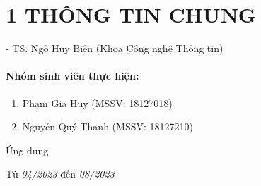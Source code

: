 \newpage

\section*{1  THÔNG TIN CHUNG}

\tab \tab - TS. Ngô Huy Biên (Khoa Công nghệ Thông tin)    

\paragraph{Nhóm sinh viên thực hiện:}
\begin{enumerate}
    \item Phạm Gia Huy (MSSV: 18127018)
    \item Nguyễn Quý Thanh (MSSV: 18127210)
\end{enumerate}

Ứng dụng

Từ \textsl{04/2023} đến \textsl{08/2023}

